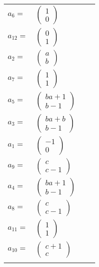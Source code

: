 \documentclass[1p]{elsarticle_modified}
\theoremstyle{definition}
\begin{document}
\begin{tabular}{m{7pt} m{180pt} m{7pt} m{180pt} }
\flushright $a_{6}=$&$\begin{pmatrix}1\\0\end{pmatrix}$ \\
\flushright $a_{12}=$&$\begin{pmatrix}0\\1\end{pmatrix}$ \\
\flushright $a_{2}=$&$\begin{pmatrix}a\\b\end{pmatrix}$ \\
\flushright $a_{7}=$&$\begin{pmatrix}1\\1\end{pmatrix}$ \\
\flushright $a_{5}=$&$\begin{pmatrix}b a+1\\b-1\end{pmatrix}$ \\
\flushright $a_{3}=$&$\begin{pmatrix}b a+b\\b-1\end{pmatrix}$ \\
\flushright $a_{1}=$&$\begin{pmatrix}-1\\0\end{pmatrix}$ \\
\flushright $a_{9}=$&$\begin{pmatrix}c\\c-1\end{pmatrix}$ \\
\flushright $a_{4}=$&$\begin{pmatrix}b a+1\\b-1\end{pmatrix}$ \\
\flushright $a_{8}=$&$\begin{pmatrix}c\\c-1\end{pmatrix}$ \\
\flushright $a_{11}=$&$\begin{pmatrix}1\\1\end{pmatrix}$ \\
\flushright $a_{10}=$&$\begin{pmatrix}c+1\\c\end{pmatrix}$\\&\end{tabular}
\end{document}
